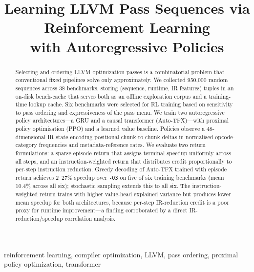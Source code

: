 \documentclass[conference]{IEEEtran}
\newcommand{\opt}[1]{\texttt{-O#1}}
\begin{document}
\title{Learning LLVM Pass Sequences via Reinforcement Learning\\
with Autoregressive Policies}

\author{
}

\maketitle

\begin{abstract}
Selecting and ordering LLVM optimization passes is a combinatorial problem
that conventional fixed pipelines solve only approximately.
We collected 950{,}000 random sequences across 38 benchmarks, storing
(sequence, runtime, IR features) tuples in an on-disk bench-cache that
serves both as an offline exploration corpus and a training-time lookup
cache.
Six benchmarks were selected for RL training based on sensitivity to pass
ordering and expressiveness of the pass menu.
We train two autoregressive policy architectures---a GRU and a causal
transformer (Auto-TFX)---with proximal policy optimisation (PPO) and a
learned value baseline.
Policies observe a 48-dimensional IR state encoding positional chunk-to-chunk
deltas in normalised opcode-category frequencies and metadata-reference rates.
We evaluate two return formulations: a sparse episode return that assigns
terminal speedup uniformly across all steps, and an instruction-weighted
return that distributes credit proportionally to per-step instruction
reduction.
Greedy decoding of Auto-TFX trained with episode return achieves
2--27\% speedup over \opt{3} on five of six training benchmarks
(mean 10.4\% across all six); stochastic sampling extends this to all six.
The instruction-weighted return trains with higher value-head explained
variance but produces lower mean speedup for both architectures, because
per-step IR-reduction credit is a poor proxy for runtime improvement---a
finding corroborated by a direct IR-reduction/speedup correlation analysis.
\end{abstract}

\begin{IEEEkeywords}
reinforcement learning, compiler optimization, LLVM, pass ordering,
proximal policy optimization, transformer
\end{IEEEkeywords}
\end{document}
